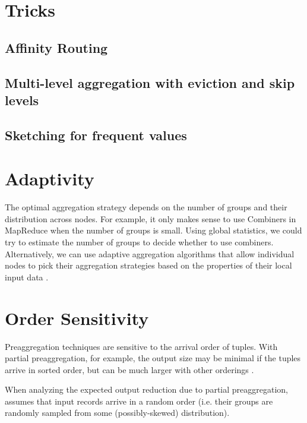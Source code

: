 \documentclass[12pt]{article}
\begin{document}
\pagebreak
\section{Tricks}

\subsection{Affinity Routing}

\subsection{Multi-level aggregation with eviction and skip levels}

\subsection{Sketching for frequent values}


\section{Adaptivity}

The optimal aggregation strategy depends on the number of groups and their
distribution across nodes.
For example, it only makes sense to use Combiners in MapReduce when the number of groups is small.
Using global statistics, we could try to estimate the number of groups to decide whether to use combiners.
Alternatively, we can use adaptive aggregation algorithms that allow individual nodes to pick their aggregation strategies based on the properties of their local input data \cite{adaptive-aggregation}.


\section{Order Sensitivity}
Preaggregation techniques are sensitive to the arrival order of tuples.  With partial preaggregation, for example, the output size may be minimal if the tuples arrive in sorted order, but can be much larger with other orderings \cite{partial-preaggregation}.

When analyzing the expected output reduction due to partial preaggregation, \cite{partial-preaggregation} assumes that input records arrive in a random order (i.e. their groups are randomly sampled from some (possibly-skewed) distribution).
\end{document}

